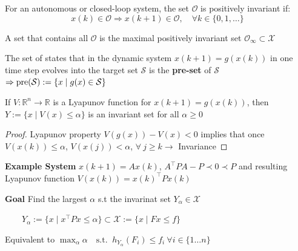 

\begin{definition}
  For an autonomous or closed-loop system,
  the set $\mathcal{O}$ is positively invariant if:
  \[
    x(k)\in\mathcal{O}\Rightarrow
    x(k+1) \in \mathcal{O},
    \quad \forall k \in \{0,1,\dots\}
  \]
\end{definition}

\begin{definition}
  A set that contains all $\mathcal{O}$
  is the maximal positively invariant set
  $\mathcal{O}_\infty \subset \mathcal{X}$
\end{definition}

\begin{definition}
  The set of states that
  in the dynamic system $x(k+1) = g(x(k))$
  in one time step evolves into the target set $\mathcal{S}$
  is the \textbf{pre-set} of $\mathcal{S}$
  $\Rightarrow \operatorname{pre}(\mathcal{S}) := \{x\mid g(x)\in \mathcal{S}\}$
\end{definition}

\begin{lemma}{}

  If $V:\mathbb{R}^n \to \mathbb{R}$ is a Lyapunov function
  for $x(k+1) = g(x(k))$, then
  $Y := \{x \mid V(x) \leq \alpha\}$
  is an invariant set for all $\alpha \geq 0$
\end{lemma}
\begin{proof}
  Lyapunov property $V(g(x)) - V(x) < 0$
  implies that once $V(x(k))\leq \alpha$,
  $V(x(j))<\alpha$,
  $\forall\ j\ge k \rightarrow$ Invariance
\end{proof}

\textbf{Example System}
$x(k+1) = Ax(k)$, $A^\top P A - P \prec 0 \prec P$
and resulting  Lyapunov function
$V(x(k)) = x(k)^\top P x(k)$

\textbf{Goal} Find the largest $\alpha$ s.t the
invarinat set $Y_\alpha \in \mathcal{X}$

$\qquad Y_\alpha := \{x \mid x^\top P x \leq \alpha\}\subset
\mathcal{X} := \{x \mid Fx\leq f\}$

Equivalent to $\max_\alpha \alpha \quad \text{s.t. }\
h_{Y_\alpha}(F_i) \leq f_i \ \forall i \in \{1\dots n\}$

